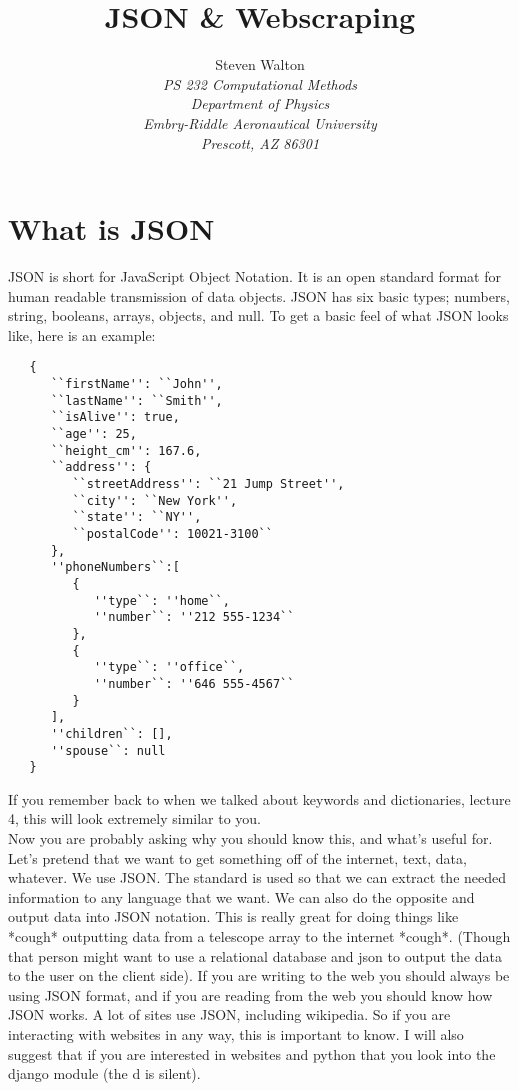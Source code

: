 \documentclass[11pt]{article}   %
\title{JSON & Webscraping}
\author{Steven Walton\\     %
\textit{PS 232 Computational Methods}\\
\textit{Department of Physics}\\
\textit{Embry-Riddle Aeronautical University}\\
\textit{Prescott, AZ   86301}}
\begin{document}
\maketitle
\section*{What is JSON}
JSON is short for JavaScript Object Notation.  It is an open standard format for human readable transmission of data objects.  JSON has six basic types; numbers, string, booleans, arrays, objects, and null.  To get a basic feel of 
what JSON looks like, here is an example:
\begin{tcolorbox}
   \begin{lstlisting}
   {
      ``firstName'': ``John'',
      ``lastName'': ``Smith'',
      ``isAlive'': true,
      ``age'': 25,
      ``height_cm'': 167.6,
      ``address'': {
         ``streetAddress'': ``21 Jump Street'',
         ``city'': ``New York'',
         ``state'': ``NY'',
         ``postalCode'': 10021-3100``
      },
      ''phoneNumbers``:[
         {
            ''type``: ''home``,
            ''number``: ''212 555-1234``
         },
         {
            ''type``: ''office``,
            ''number``: ''646 555-4567``
         }
      ],
      ''children``: [],
      ''spouse``: null
   }
   \end{lstlisting}
\end{tcolorbox}
If you remember back to when we talked about keywords and dictionaries, lecture 4, this will look extremely similar to you.
\\
Now you are probably asking why you should know this, and what's useful for.  Let's pretend that we want to get something off of the internet, text, data, whatever.  We use JSON.  The standard is used so that we can extract the needed
information to any language that we want.  We can also do the opposite and output data into JSON notation.  This is really great for doing things like *cough* outputting data from a telescope array to the internet *cough*. (Though that person might want to use a relational database and json to output the data to the user on the client side).
If you are writing to the web you should always be using JSON format, and if you are reading from the web you should know how JSON works.  A lot of sites use JSON, including wikipedia.  So if you are interacting with websites in 
any way, this is important to know. I will also suggest that if you are interested in websites and python that you look into the django module (the d is silent).
\end{document}
